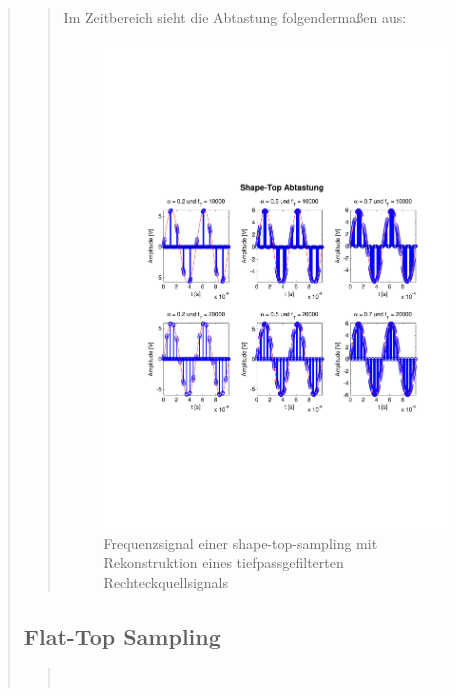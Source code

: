 \begin{quote}
\begin{quote}
        	Im Zeitbereich sieht die Abtastung folgendermaßen aus:
        	
        	\begin{figure}[H]
            \centering
            \includegraphics[scale=0.6, trim = 1.5cm 6cm 1cm 8cm,
            clip]{./Bilder/shape-top-zeit_3V}
                \caption{Frequenzsignal einer shape-top-sampling mit Rekonstruktion
                eines tiefpassgefilterten Rechteckquellsignals}
      	    \end{figure}
        	
        
        \end{quote}  %
        
        \subsection{Flat-Top Sampling}
        \begin{quote}
             \\
        \end{quote}  %
       	

\end{quote}
